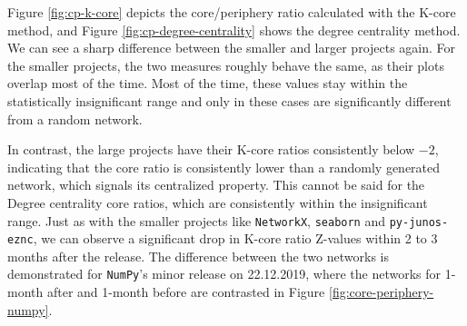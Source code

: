Figure \ref{fig:cp-k-core} depicts the core/periphery ratio calculated with the K-core method, and Figure \ref{fig:cp-degree-centrality} shows the degree centrality method. We can see a sharp difference between the smaller and larger projects again. For the smaller projects, the two measures roughly behave the same, as their plots overlap most of the time. Most of the time, these values stay within the statistically insignificant range and only in these cases are significantly different from a random network.

In contrast, the large projects have their K-core ratios consistently below $-2$, indicating that the core ratio is consistently lower than a randomly generated network, which signals its centralized property. This cannot be said for the Degree centrality core ratios, which are consistently within the insignificant range. Just as with the smaller projects like \texttt{NetworkX}, \texttt{seaborn} and \texttt{py-junos-eznc}, we can observe a significant drop in K-core ratio Z-values within 2 to 3 months after the release. The difference between the two networks is demonstrated for \texttt{NumPy}'s minor release on 22.12.2019, where the networks for 1-month after and 1-month before are contrasted in Figure \ref{fig:core-periphery-numpy}.

